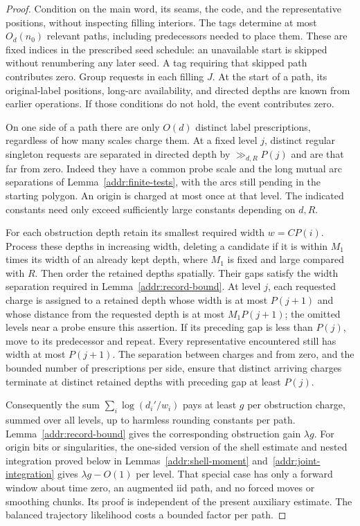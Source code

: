 \begin{proof}
Condition on the main word, its seams, the code, and the representative
positions, without inspecting filling interiors.  The tags determine
at most $O_d(n_0)$ relevant paths, including predecessors needed to
place them. These are fixed indices in the prescribed seed schedule: an
unavailable start is skipped without renumbering any later seed. A tag
requiring that skipped path contributes zero. Group requests in each filling $J$. At the start of
a path, its original-label positions, long-arc availability, and
directed depths are known from earlier operations.  If those
conditions do not hold, the event contributes zero.

On one side of a path there are only $O(d)$ distinct label
prescriptions, regardless of how many scales charge them.  At a
fixed level $j$, distinct regular singleton requests are separated
in directed depth by $\gg_{d,R}P(j)$ and are that far from zero.
Indeed they have a common probe scale and the long mutual arc
separations of Lemma~\ref{addr:finite-tests}, with the arcs still
pending in the starting polygon.  An origin is charged at most once
at that level.  The indicated constants need only exceed sufficiently
large constants depending on $d,R$.

For each obstruction depth retain its smallest required width
$w=CP(i)$.  Process these depths in increasing width, deleting a
candidate if it is within $M_1$ times its width of an already kept
depth, where $M_1$ is fixed and large compared with $R$.
Then order the retained depths spatially.  Their gaps satisfy the
width separation required in Lemma~\ref{addr:record-bound}.
At level $j$, each requested charge is assigned to a retained depth
whose width is at most $P(j+1)$ and whose distance from the requested
depth is at most $M_1P(j+1)$; the omitted levels near a probe ensure
this assertion.  If its preceding gap is less than $P(j)$, move to
its predecessor and repeat.  Every representative encountered still
has width at most $P(j+1)$.  The separation between charges and from
zero, and the bounded number of prescriptions per side, ensure that
distinct arriving charges terminate at distinct retained depths with
preceding gap at least $P(j)$.

Consequently the sum $\sum_i\log(d_i'/w_i)$ pays at least $g$
per obstruction charge, summed over all levels, up to harmless
rounding constants per path.  Lemma~\ref{addr:record-bound} gives
the corresponding obstruction gain $\lambda g$.
For origin bits or singularities, the one-sided version of the shell
estimate and nested integration proved below in
Lemmas~\ref{addr:shell-moment} and~\ref{addr:joint-integration}
gives $\lambda g-O(1)$ per level.  That special case has only a
forward window about time zero, an augmented iid path, and no forced
moves or smoothing chunks.  Its proof is independent of the present
auxiliary estimate.  The balanced trajectory likelihood costs a
bounded factor per path.


\end{proof}
